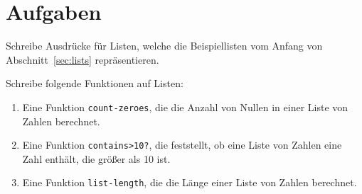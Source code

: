 \section*{Aufgaben}

\begin{aufgabe}
  Schreibe Ausdrücke für Listen, welche die Beispiellisten vom
  Anfang von Abschnitt~\ref{sec:lists} repräsentieren.
\end{aufgabe}

\begin{aufgabe}
Schreibe folgende Funktionen auf Listen:
  
  \begin{enumerate} 
    
  \item Eine Funktion \texttt{count-zeroes}, die die Anzahl von Nullen
    in einer Liste von Zahlen berechnet.
    
  \item Eine Funktion \texttt{contains>10?}, die feststellt, ob eine
    Liste von Zahlen eine Zahl enthält, die größer als 10 ist.
    
  \item Eine Funktion \texttt{list-length}, die die Länge einer Liste
    von Zahlen berechnet.

  \end{enumerate}
  
\end{aufgabe}

